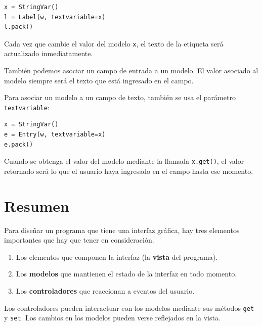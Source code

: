 \begin{lstlisting}
x = StringVar()
l = Label(w, textvariable=x)
l.pack()
\end{lstlisting}

Cada vez que cambie el valor del modelo \lstinline!x!, el texto de la
etiqueta será actua\-li\-zado inmediatamente.

También podemos asociar un campo de entrada a un modelo. El valor
asociado al modelo siempre será el texto que está ingresado en el campo.

Para asociar un modelo a un campo de texto, también se usa el parámetro
\lstinline!textvariable!:

\begin{lstlisting}
x = StringVar()
e = Entry(w, textvariable=x)
e.pack()
\end{lstlisting}

Cuando se obtenga el valor del modelo mediante la llamada
\lstinline!x.get()!, el valor retornado será lo que el usuario haya
ingresado en el campo hasta ese momento.

\section{Resumen}

Para diseñar un programa que tiene una interfaz gráfica, hay tres
elementos importantes que hay que tener en consideración.

\begin{enumerate}
\item
  Los elementos que componen la interfaz (la \textbf{vista} del programa).
\item
  Los \textbf{modelos} que mantienen el estado de la interfaz en todo
  momento.
\item
  Los \textbf{controladores} que reaccionan a eventos del usuario.
\end{enumerate}

Los controladores pueden interactuar con los modelos mediante sus
métodos \lstinline!get! y \lstinline[language={}]!set!. Los cambios en los modelos
pueden verse reflejados en la vista.
